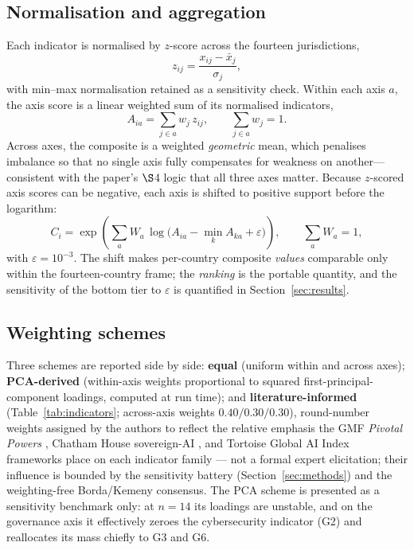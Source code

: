 \documentclass[11pt]{article}
\begin{document}
\subsection{Normalisation and aggregation}
Each indicator is normalised by $z$-score across the fourteen jurisdictions,
\begin{equation}
z_{ij} = \frac{x_{ij} - \bar{x}_j}{\sigma_j},
\end{equation}
with min--max normalisation retained as a sensitivity check. Within each axis $a$, the axis score is a linear weighted sum of its normalised indicators,
\begin{equation}\label{eq:axis}
A_{ia} = \sum_{j \in a} w_j\, z_{ij}, \qquad \sum_{j \in a} w_j = 1 .
\end{equation}
Across axes, the composite is a weighted \emph{geometric} mean, which penalises imbalance so that no single axis fully compensates for weakness on another---consistent with the paper's $\S$4 logic that all three axes matter. Because $z$-scored axis scores can be negative, each axis is shifted to positive support before the logarithm:
\begin{equation}
C_i = \exp\!\left( \sum_{a} W_a \, \log\!\big( A_{ia} - \min_k A_{ka} + \varepsilon \big) \right), \qquad \sum_a W_a = 1,
\end{equation}
with $\varepsilon = 10^{-3}$. The shift makes per-country composite \emph{values} comparable only within the fourteen-country frame; the \emph{ranking} is the portable quantity, and the sensitivity of the bottom tier to $\varepsilon$ is quantified in Section~\ref{sec:results}.

\subsection{Weighting schemes}
Three schemes are reported side by side: \textbf{equal} (uniform within and across axes); \textbf{PCA-derived} (within-axis weights proportional to squared first-principal-component loadings, computed at run time); and \textbf{literature-informed} (Table~\ref{tab:indicators}; across-axis weights $0.40/0.30/0.30$), round-number weights assigned by the authors to reflect the relative emphasis the GMF \emph{Pivotal Powers} \citep{dehoopscheffer2024pivotal}, Chatham House sovereign-AI \citep{sandoval2026sovereign}, and Tortoise Global AI Index \citep{tortoise2023globalai} frameworks place on each indicator family --- not a formal expert elicitation; their influence is bounded by the sensitivity battery (Section~\ref{sec:methods}) and the weighting-free Borda/Kemeny consensus. The PCA scheme is presented as a sensitivity benchmark only: at $n=14$ its loadings are unstable, and on the governance axis it effectively zeroes the cybersecurity indicator (G2) and reallocates its mass chiefly to G3 and G6.
\end{document}
